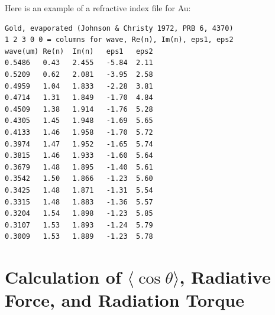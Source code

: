 Here is an example of a refractive index file for Au:
{\footnotesize
\begin{verbatim}
Gold, evaporated (Johnson & Christy 1972, PRB 6, 4370)
1 2 3 0 0 = columns for wave, Re(n), Im(n), eps1, eps2
wave(um) Re(n)  Im(n)   eps1   eps2
0.5486   0.43   2.455   -5.84  2.11
0.5209   0.62   2.081   -3.95  2.58
0.4959   1.04   1.833   -2.28  3.81
0.4714   1.31   1.849   -1.70  4.84
0.4509   1.38   1.914   -1.76  5.28
0.4305   1.45   1.948   -1.69  5.65
0.4133   1.46   1.958   -1.70  5.72
0.3974   1.47   1.952   -1.65  5.74
0.3815   1.46   1.933   -1.60  5.64
0.3679   1.48   1.895   -1.40  5.61
0.3542   1.50   1.866   -1.23  5.60
0.3425   1.48   1.871   -1.31  5.54
0.3315   1.48   1.883   -1.36  5.57
0.3204   1.54   1.898   -1.23  5.85
0.3107   1.53   1.893   -1.24  5.79
0.3009   1.53   1.889   -1.23  5.78
\end{verbatim}
}

\section{Calculation of $\langle\cos\theta\rangle$, Radiative Force, and 
         Radiation Torque
	\label{sec:force and torque calculation}}

